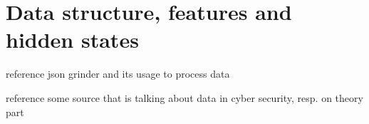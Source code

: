 \chapter{Data structure, features and hidden states}

reference json grinder and its usage to process data

reference some source that is talking about data in cyber security, resp. on theory part
